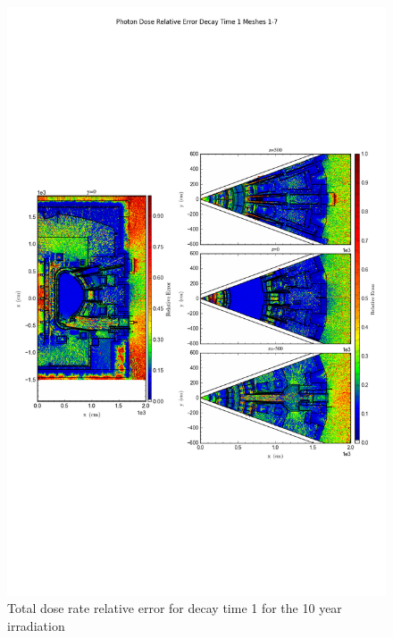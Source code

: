 \documentclass[12pt]{article}
\begin{document}
\begin{figure}[ht!]
\centering
\includegraphics[trim={0cm 8cm, 0cm 8cm},clip,scale=0.75]{../plots/final_model_with_b4c/10year/Photon_Dose_Relative_Error_Decay_Time_1_Meshes_1-7.png}
\caption{Total dose rate relative error for decay time 1 for the 10 year irradiation}
\label{fig:photons_10y_dc1_nob4c_relerr}
\end{figure}
\clearpage
\end{document}
